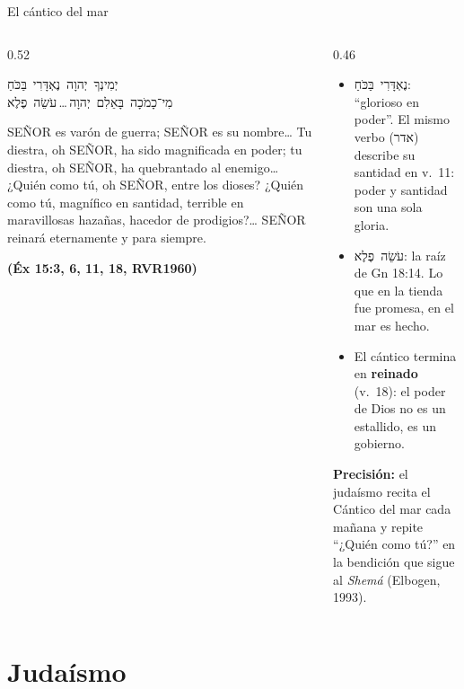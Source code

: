 \documentclass[hyperref={bookmarks=false},aspectratio=169]{beamer}
\newcommand{\heb}[1]{\mbox{\foreignlanguage{hebrew}{#1}}}
\newcommand{\SENOR}{S{\fontsize{0.78em}{1em}\selectfont EÑOR}}
\newcommand{\fuente}[1]{\par\hfill{\upshape\bfseries\footnotesize\textcolor{azul}{#1}}}
\newcommand{\destacar}[1]{\textbf{\textcolor{azul}{#1}}}
\newcommand{\precision}[1]{{\footnotesize\color{gris}\textbf{Precisión:} #1}}
\begin{document}
\begin{frame}{El cántico del mar}
\begin{columns}[t,onlytextwidth]
\begin{column}{0.52\textwidth}
\begin{center}\scriptsize\heb{יְמִינְךָ יְהוָה נֶאְדָּרִי בַּכֹּחַ}\\[1pt]\heb{מִי־כָמֹכָה בָּאֵלִם יְהוָה}\,\ldots\,\heb{עֹשֵׂה פֶלֶא}\end{center}
\begin{cita}[fontupper=\scriptsize\itshape]\SENOR{} es varón de guerra; \SENOR{} es su nombre\ldots{} Tu diestra, oh \SENOR, ha sido magnificada en poder; tu diestra, oh \SENOR, ha quebrantado al enemigo\ldots{} ¿Quién como tú, oh \SENOR, entre los dioses? ¿Quién como tú, magnífico en santidad, terrible en maravillosas hazañas, hacedor de prodigios?\ldots{} \SENOR{} reinará eternamente y para siempre.\fuente{(Éx 15:3, 6, 11, 18, RVR1960)}\end{cita}
\end{column}
\begin{column}{0.46\textwidth}\small
\begin{itemize}
\item \heb{נֶאְדָּרִי בַּכֹּחַ}: ``glorioso en poder''. El mismo verbo (\heb{אדר}) describe su santidad en v.~11: poder y santidad son una sola gloria.
\item \heb{עֹשֵׂה פֶלֶא}: la raíz de Gn 18:14. Lo que en la tienda fue promesa, en el mar es hecho.
\item El cántico termina en \destacar{reinado} (v.~18): el poder de Dios no es un estallido, es un gobierno.
\end{itemize}
\precision{el judaísmo recita el Cántico del mar cada mañana y repite ``¿Quién como tú?'' en la bendición que sigue al \emph{Shemá} (Elbogen, 1993).}
\end{column}
\end{columns}
\end{frame}

\section{Judaísmo}
\end{document}
